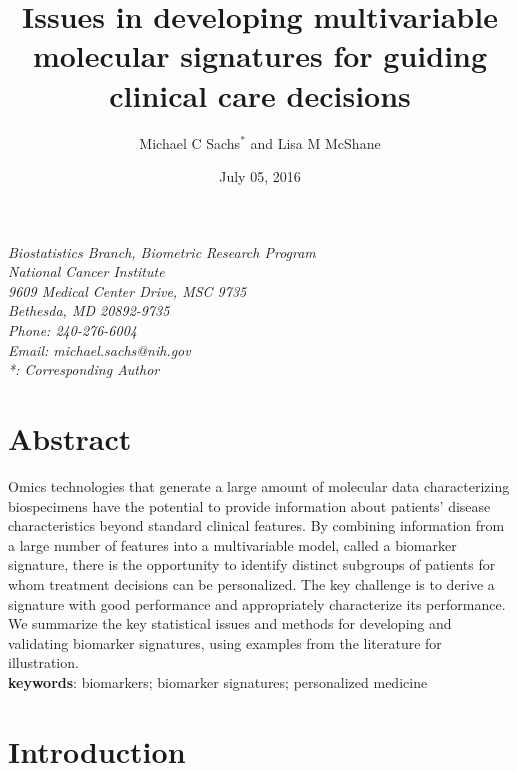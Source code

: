 \documentclass[11pt,]{article}
\title{Issues in developing multivariable molecular signatures for guiding
clinical care decisions}
\author{Michael C Sachs$^*$ and Lisa M McShane}
\date{July 05, 2016}
\begin{document}
\maketitle

\begin{center}
\textit{Biostatistics Branch, Biometric Research Program \\
National Cancer Institute \\
9609 Medical Center Drive, MSC 9735 \\
Bethesda, MD 20892-9735 \\
Phone: 240-276-6004 \\
Email: michael.sachs@nih.gov \\
*: Corresponding Author}

\end{center}

\section{Abstract}\label{abstract}

Omics technologies that generate a large amount of molecular data
characterizing biospecimens have the potential to provide information
about patients' disease characteristics beyond standard clinical
features. By combining information from a large number of features into
a multivariable model, called a biomarker signature, there is the
opportunity to identify distinct subgroups of patients for whom
treatment decisions can be personalized. The key challenge is to derive
a signature with good performance and appropriately characterize its
performance. We summarize the key statistical issues and methods for
developing and validating biomarker signatures, using examples from the
literature for illustration. \\

\textbf{keywords}: biomarkers; biomarker signatures; personalized medicine

\clearpage

\section{Introduction}\label{introduction}
\end{document}

